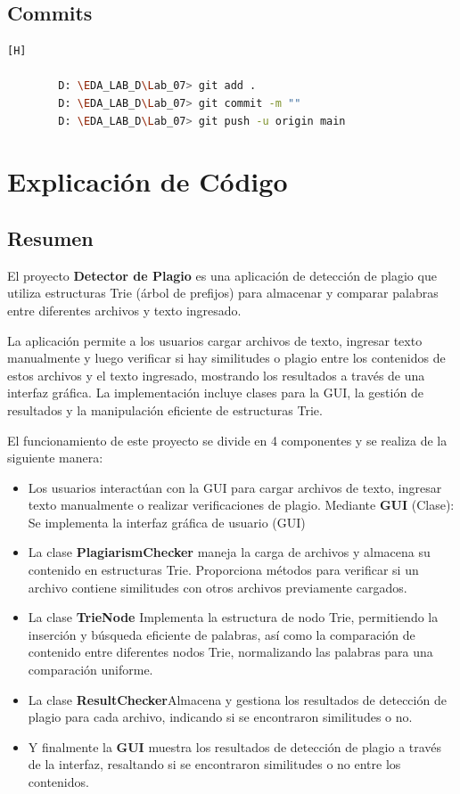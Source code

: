 \documentclass{article}
\begin{document}
	\subsection{Commits}
	\begin{lstlisting}[language=bash,caption={Commit: Creamos el trie principal}][H]
		
		D: \EDA_LAB_D\Lab_07> git add .
		D: \EDA_LAB_D\Lab_07> git commit -m ""	
		D: \EDA_LAB_D\Lab_07> git push -u origin main
	\end{lstlisting}
 	
	\section{Explicación de Código}
	 \subsection{Resumen}
	 \begin{minipage}{\textwidth}\setlength{\parskip}{2mm}
	 El proyecto \textbf{Detector de Plagio} es una aplicación de detección de plagio que utiliza estructuras Trie (árbol de prefijos) para almacenar y comparar palabras entre diferentes archivos y texto ingresado. 
	 
La aplicación permite a los usuarios cargar archivos de texto, ingresar texto manualmente y luego verificar si hay similitudes o plagio entre los contenidos de estos archivos y el texto ingresado, mostrando los resultados a través de una interfaz gráfica. La implementación incluye clases para la GUI, la gestión de resultados y la manipulación eficiente de estructuras Trie. 

El funcionamiento de este proyecto se divide en 4 componentes y se realiza de la siguiente manera:
\begin{itemize}
\item Los usuarios interactúan con la GUI para cargar archivos de texto, ingresar texto manualmente o realizar verificaciones de plagio. Mediante \textbf{GUI} (Clase): Se implementa la interfaz gráfica de usuario (GUI) 
\item La clase \textbf{PlagiarismChecker} maneja la carga de archivos y almacena su contenido en estructuras Trie. Proporciona métodos para verificar si un archivo contiene similitudes con otros archivos previamente cargados.
\item La clase \textbf{TrieNode} Implementa la estructura de nodo Trie, permitiendo la inserción y búsqueda eficiente de palabras, así como la comparación de contenido entre diferentes nodos Trie, normalizando las palabras para una comparación uniforme.
\item La clase \textbf{ResultChecker}Almacena y gestiona los resultados de detección de plagio para cada archivo, indicando si se encontraron similitudes o no.
\item Y finalmente la \textbf{GUI} muestra los resultados de detección de plagio a través de la interfaz, resaltando si se encontraron similitudes o no entre los contenidos.
\end{itemize}
	 \end{minipage}
	 \clearpage
\end{document}
